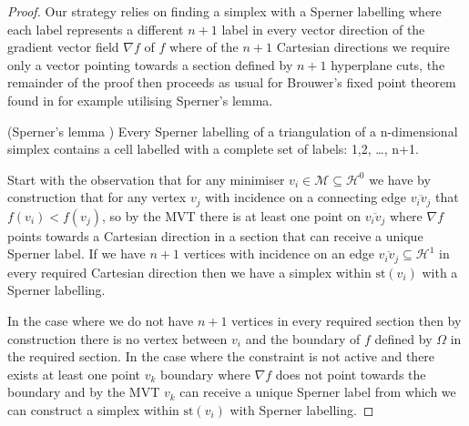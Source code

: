 \begin{proof}
Our strategy relies on finding a simplex with a Sperner labelling where each label represents a different $n + 1$ label in every vector direction of the gradient vector field $\nabla f$ of $f$ where of the $n + 1$ Cartesian directions we require only a vector pointing towards a section defined by $n + 1$ hyperplane cuts, the remainder of the proof then proceeds as usual for Brouwer's fixed point theorem \cite{Brouwer1911} found in for example \citet[p. 40]{Henle1979} utilising Sperner's lemma.

\begin{theorem} (Sperner's lemma \citep{Sperner1928}) Every Sperner labelling of a triangulation of a n-dimensional simplex contains a cell labelled with a complete set of labels:  {1,2, \dots, n+1}.
\end{theorem}

Start with the observation that for any minimiser $v_i \in \mathcal{M} \subseteq \mathcal{H}^0$ we have by construction that for any vertex $v_j$ with incidence on a connecting edge $\overline{v_i v_j}$ that $f(v_i) < f(v_j)$, so by the MVT there is at least one point on $\overline{v_i v_j}$ where $\nabla f$ points towards a Cartesian direction in a section that can receive a unique Sperner label. If we have $n+1$ vertices with incidence on an edge $ \overline{v_i v_j}\subseteq \mathcal{H}^1$ in every required Cartesian direction then we have a simplex within $\textrm{st}\left( v_i \right)$ with a Sperner labelling. 

In the case where we do not have $n+1$ vertices in every required section then by construction there is no vertex between $v_i$ and the boundary of $f$ defined by $\Omega$ in the required section. In the case where the constraint is not active and there exists at least one point $v_k$ boundary where $\nabla f$ does not point towards the boundary and by the MVT $v_k$ can receive a unique Sperner label from which we can construct a simplex within $\textrm{st}\left( v_i \right)$ with Sperner labelling.


\end{proof}
